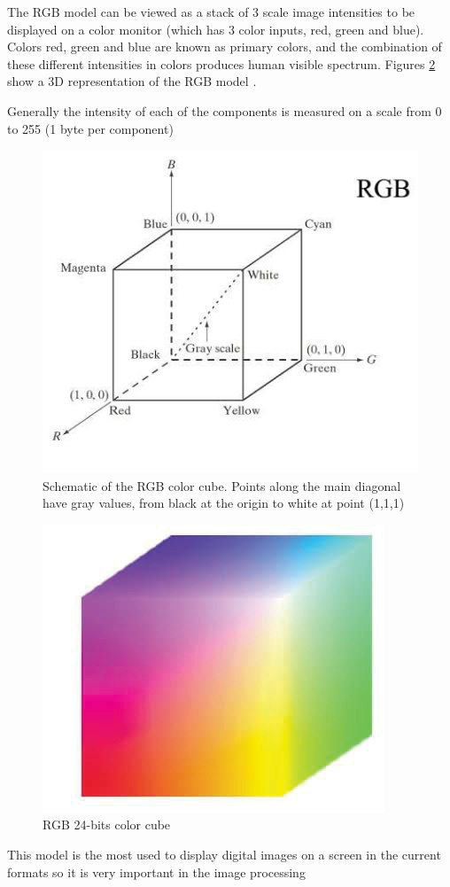The RGB model can be viewed as a stack of 3 scale image intensities to be displayed on a color monitor (which has 3 color inputs, red, green and blue). Colors red, green and blue are known as primary colors, and the combination of these different intensities in colors produces human visible spectrum. Figures \ref{fig:RGBColorCube} show a 3D representation of the RGB model \cite{dip4}.

Generally the intensity of each of the components is measured on a scale from 0 to 255 (1 byte per component)

\begin{figure}
	\centering  
  	\includegraphics[scale=1]{images/ch2/RGBColorCube.jpg}
  	\caption{Schematic of the RGB color cube. Points along the main diagonal have gray values, from black at the origin to white at point (1,1,1)}
  	\label{fig:RGBColorCube}
\end{figure}

\begin{figure}
	\centering
  	\includegraphics[scale=0.8]{images/ch2/RGB24ColorCube.jpg}
  	\caption{RGB 24-bits color cube}
  	\label{fig:RGBColorCube}
\end{figure}
This model is the most used to display digital images on a screen in the current formats so it is very important in the image processing\cite{dip4}

